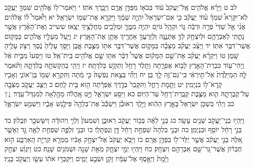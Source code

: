 \documentclass[twoside, openany, parskip=half, 11pt]{book}
\begin{document}
לב ט וַיֵּרָ֨א אֱלֹהִ֤ים אֶֽל־יַעֲקֹב֙ ע֔וֹד בְּבֹא֖וֹ מִפַּדַּ֣ן אֲרָ֑ם וַיְבָ֖רֶךְ אֹתֽוֹ׃ י וַיֹּֽאמֶר־ל֥וֹ אֱלֹהִ֖ים שִׁמְךָ֣ יַעֲקֹ֑ב לֹֽא־יִקָּרֵא֩ שִׁמְךָ֨ ע֜וֹד יַעֲקֹ֗ב כִּ֤י אִם־יִשְׂרָאֵל֙ יִהְיֶ֣ה שְׁמֶ֔ךָ וַיִּקְרָ֥א אֶת־שְׁמ֖וֹ יִשְׂרָאֵֽל׃ יא וַיֹּ֩אמֶר֩ ל֨וֹ אֱלֹהִ֜ים אֲנִ֨י אֵ֤ל שַׁדַּי֙ פְּרֵ֣ה וּרְבֵ֔ה גּ֛וֹי וּקְהַ֥ל גּוֹיִ֖ם יִהְיֶ֣ה מִמֶּ֑ךָּ וּמְלָכִ֖ים מֵחֲלָצֶ֥יךָ יֵצֵֽאוּ׃ ששייב וְאֶת־הָאָ֗רֶץ אֲשֶׁ֥ר נָתַ֛תִּי לְאַבְרָהָ֥ם וּלְיִצְחָ֖ק לְךָ֣ אֶתְּנֶ֑נָּה וּֽלְזַרְעֲךָ֥ אַחֲרֶ֖יךָ אֶתֵּ֥ן אֶת־הָאָֽרֶץ׃ יג וַיַּ֥עַל מֵעָלָ֖יו אֱלֹהִ֑ים בַּמָּק֖וֹם אֲשֶׁר־דִּבֶּ֥ר אִתּֽוֹ׃ יד וַיַּצֵּ֨ב יַעֲקֹ֜ב מַצֵּבָ֗ה בַּמָּק֛וֹם אֲשֶׁר־דִּבֶּ֥ר אִתּ֖וֹ מַצֶּ֣בֶת אָ֑בֶן וַיַּסֵּ֤ךְ עָלֶ֙יהָ֙ נֶ֔סֶךְ וַיִּצֹ֥ק עָלֶ֖יהָ שָֽׁמֶן׃ טו וַיִּקְרָ֨א יַעֲקֹ֜ב אֶת־שֵׁ֣ם הַמָּק֗וֹם אֲשֶׁר֩ דִּבֶּ֨ר אִתּ֥וֹ שָׁ֛ם אֱלֹהִ֖ים בֵּֽית־אֵֽל׃ טז וַיִּסְעוּ֙ מִבֵּ֣ית אֵ֔ל וַֽיְהִי־ע֥וֹד כִּבְרַת־הָאָ֖רֶץ לָב֣וֹא אֶפְרָ֑תָה וַתֵּ֥לֶד רָחֵ֖ל וַתְּקַ֥שׁ בְּלִדְתָּֽהּ׃ יז וַיְהִ֥י בְהַקְשֹׁתָ֖הּ בְּלִדְתָּ֑הּ וַתֹּ֨אמֶר לָ֤הּ הַמְיַלֶּ֙דֶת֙ אַל־תִּ֣ירְאִ֔י כִּֽי־גַם־זֶ֥ה לָ֖ךְ בֵּֽן׃ יח וַיְהִ֞י בְּצֵ֤את נַפְשָׁהּ֙ כִּ֣י מֵ֔תָה וַתִּקְרָ֥א שְׁמ֖וֹ בֶּן־אוֹנִ֑י וְאָבִ֖יו קָֽרָא־ל֥וֹ בִנְיָמִֽין׃ יט וַתָּ֖מׇת רָחֵ֑ל וַתִּקָּבֵר֙ בְּדֶ֣רֶךְ אֶפְרָ֔תָה הִ֖וא בֵּ֥ית לָֽחֶם׃ כ וַיַּצֵּ֧ב יַעֲקֹ֛ב מַצֵּבָ֖ה עַל־קְבֻרָתָ֑הּ הִ֛וא מַצֶּ֥בֶת קְבֻֽרַת־רָחֵ֖ל עַד־הַיּֽוֹם׃ כא וַיִּסַּ֖ע יִשְׂרָאֵ֑ל וַיֵּ֣ט אׇֽהֳלֹ֔ה מֵהָ֖לְאָה לְמִגְדַּל־עֵֽדֶר׃ ↓↑ כב וַיְהִ֗י בִּשְׁכֹּ֤ן יִשְׂרָאֵל֙ בָּאָ֣רֶץ הַהִ֔וא וַיֵּ֣לֶךְ רְאוּבֵ֗‍֔ן וַיִּשְׁכַּ֕ב֙ אֶת־בִּלְהָ֖ה֙ פִּילֶ֣גֶשׁ אָבִ֑֔יו וַיִּשְׁמַ֖ע יִשְׂרָאֵ֑‍ֽל

וַיִּֽהְי֥וּ בְנֵֽי־יַעֲקֹ֖ב שְׁנֵ֥ים עָשָֽׂר׃ כג בְּנֵ֣י לֵאָ֔ה בְּכ֥וֹר יַעֲקֹ֖ב רְאוּבֵ֑ן וְשִׁמְעוֹן֙ וְלֵוִ֣י וִֽיהוּדָ֔ה וְיִשָּׂשכָ֖ר וּזְבֻלֽוּן׃ כד בְּנֵ֣י רָחֵ֔ל יוֹסֵ֖ף וּבִנְיָמִֽן׃ כה וּבְנֵ֤י בִלְהָה֙ שִׁפְחַ֣ת רָחֵ֔ל דָּ֖ן וְנַפְתָּלִֽי׃ כו וּבְנֵ֥י זִלְפָּ֛ה שִׁפְחַ֥ת לֵאָ֖ה גָּ֣ד וְאָשֵׁ֑ר אֵ֚לֶּה בְּנֵ֣י יַעֲקֹ֔ב אֲשֶׁ֥ר יֻלַּד־ל֖וֹ בְּפַדַּ֥ן אֲרָֽם׃ כז וַיָּבֹ֤א יַעֲקֹב֙ אֶל־יִצְחָ֣ק אָבִ֔יו מַמְרֵ֖א קִרְיַ֣ת הָֽאַרְבַּ֑ע הִ֣וא חֶבְר֔וֹן אֲשֶׁר־גָּֽר־שָׁ֥ם אַבְרָהָ֖ם וְיִצְחָֽק׃ כח וַיִּֽהְי֖וּ יְמֵ֣י יִצְחָ֑ק מְאַ֥ת שָׁנָ֖ה וּשְׁמֹנִ֥ים שָׁנָֽה׃ כט וַיִּגְוַ֨ע יִצְחָ֤ק וַיָּ֙מׇת֙ וַיֵּאָ֣סֶף אֶל־עַמָּ֔יו זָקֵ֖ן וּשְׂבַ֣ע יָמִ֑ים וַיִּקְבְּר֣וּ אֹת֔וֹ עֵשָׂ֥ו וְיַעֲקֹ֖ב בָּנָֽיו׃
\end{document}
